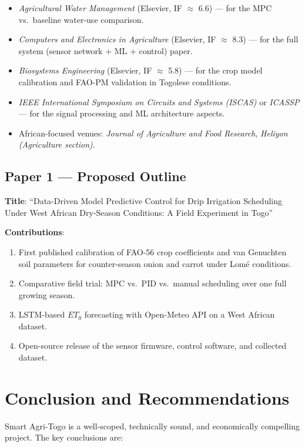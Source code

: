 \documentclass[12pt, a4paper]{report}
\begin{document}
\begin{itemize}[leftmargin=2em]
  \item \textit{Agricultural Water Management} (Elsevier, IF $\approx$ 6.6) — for the MPC vs.\ baseline water-use comparison.
  \item \textit{Computers and Electronics in Agriculture} (Elsevier, IF $\approx$ 8.3) — for the full system (sensor network + ML + control) paper.
  \item \textit{Biosystems Engineering} (Elsevier, IF $\approx$ 5.8) — for the crop model calibration and FAO-PM validation in Togolese conditions.
  \item \textit{IEEE International Symposium on Circuits and Systems (ISCAS)} or \textit{ICASSP} — for the signal processing and ML architecture aspects.
  \item African-focused venues: \textit{Journal of Agriculture and Food Research}, \textit{Heliyon (Agriculture section)}.
\end{itemize}

\section{Paper 1 — Proposed Outline}

\textbf{Title}: ``Data-Driven Model Predictive Control for Drip Irrigation Scheduling Under West African Dry-Season Conditions: A Field Experiment in Togo''

\textbf{Contributions}:
\begin{enumerate}[leftmargin=2em]
  \item First published calibration of FAO-56 crop coefficients and van Genuchten soil parameters for counter-season onion and carrot under Lomé conditions.
  \item Comparative field trial: MPC vs.\ PID vs.\ manual scheduling over one full growing season.
  \item LSTM-based $ET_0$ forecasting with Open-Meteo API on a West African dataset.
  \item Open-source release of the sensor firmware, control software, and collected dataset.
\end{enumerate}

\chapter{Conclusion and Recommendations}

Smart Agri-Togo is a well-scoped, technically sound, and economically compelling project. The key conclusions are:
\end{document}
